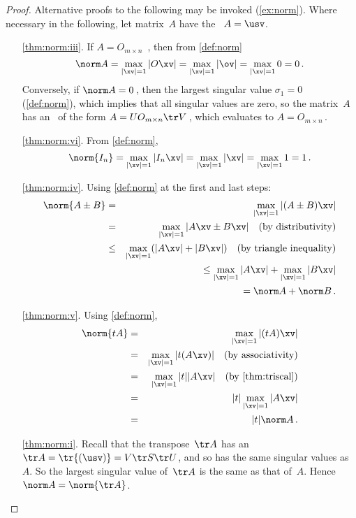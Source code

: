 \begin{proof}  Alternative proofs to the following may be invoked (\autoref{ex:norm}).
Where necessary in the following, let matrix~\(A\) have the \svd\ \(A=\usv\).
\begin{itemize}
\item[\ref{thm:norm:iii}.]
If \(A=O_{m\times n}\) \,,
then from \autoref{def:norm} 
\begin{equation*}
\norm A=\max_{|\xv|=1}|O\xv|
=\max_{|\xv|=1}|\ov|=\max_{|\xv|=1}0=0\,.
\end{equation*}
Conversely, if \(\norm A=0\)\,, then the largest singular value \(\sigma_1=0\) (\autoref{def:norm}), which implies that all singular values are zero, so the matrix~\(A\) has an \svd\ of the form \(A=UO_{m\times n}\tr V\)\,, which evaluates to \(A=O_{m\times n}\)\,.

\item[\ref{thm:norm:vi}.] From \autoref{def:norm}, 
\begin{equation*}
\norm{I_n}=\max_{|\xv|=1}|I_n\xv|
=\max_{|\xv|=1}|\xv|
=\max_{|\xv|=1}1
=1\,.
\end{equation*}


\item[\ref{thm:norm:iv}.]
Using \autoref{def:norm} at the first and last steps:
\begin{eqnarray*}
\norm{A\pm B}
&=&\max_{|\xv|=1}|(A\pm B)\xv|
\\&=&\max_{|\xv|=1}|A\xv\pm B\xv|
\quad(\text{by distributivity})
\\&\leq&\max_{|\xv|=1}(|A\xv|+ |B\xv|)
\quad(\text{by triangle inequality})
\\&&{}\leq\max_{|\xv|=1}|A\xv|+ \max_{|\xv|=1}|B\xv|
\\&&{}\phantom{\leq}=\norm A+ \norm B\,.
\end{eqnarray*}

\item[\ref{thm:norm:v}.]
Using \autoref{def:norm},
\begin{eqnarray*}
\norm{tA}
&=&\max_{|\xv|=1}|(tA)\xv|
\\&=&\max_{|\xv|=1}|t(A\xv)|
\quad(\text{by associativity})
\\&=&\max_{|\xv|=1}|t||A\xv|
\quad(\text{by \autoref{thm:triscal}})
\\&=&|t|\max_{|\xv|=1}|A\xv|
\\&=&|t|\norm A\,.
\end{eqnarray*}

\item[\ref{thm:norm:i}.]
Recall that the transpose~\(\tr A\) has an \svd\ \(\tr A=\tr{(\usv)}=V\tr S\tr U\), and so has the same singular values as~\(A\).
So the largest singular value of~\(\tr A\) is the same as that of~\(A\).
Hence \(\norm A=\norm{\tr A}\).


\end{itemize}
\end{proof}
